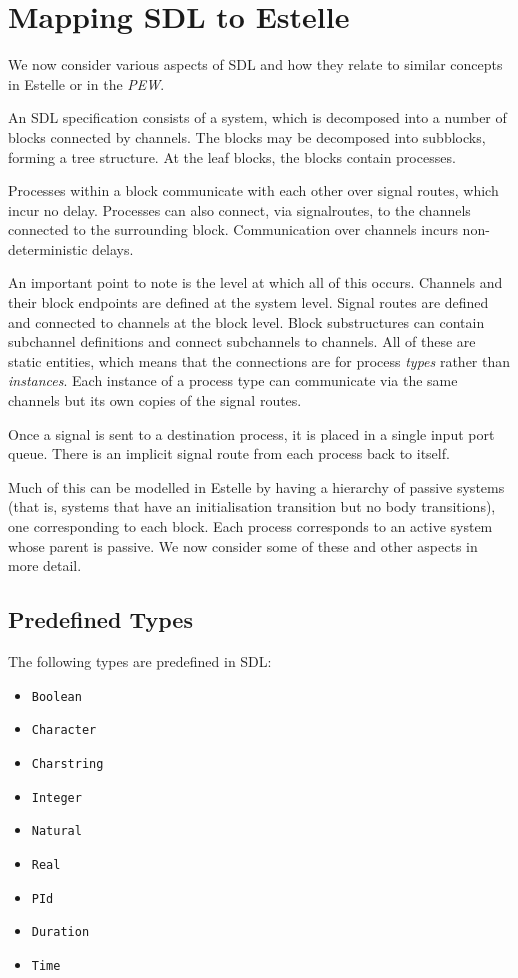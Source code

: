 \section{Mapping SDL to Estelle}

We now consider various aspects of SDL and how they relate to similar
concepts in Estelle or in the {\em PEW}.

An SDL specification consists of a system, which is decomposed into
a number of blocks connected by channels. 
The blocks may be decomposed into subblocks, forming a tree structure. 
At the leaf blocks, the blocks contain processes.

Processes within a block communicate with each other over signal
routes, which incur no delay.
Processes can also connect, via signalroutes, to the channels connected
to the surrounding block.
Communication over channels incurs non-deterministic delays.

An important point to note is the level at which all of this occurs.
Channels and their block endpoints are defined at the system level.
Signal routes are defined and connected to channels at the block level.
Block substructures can contain subchannel definitions and connect
subchannels to channels.
All of these are static entities, which means that the connections are
for process {\em types} rather than {\em instances}. 
Each instance of a process type can communicate via the same channels 
but its own copies of the signal routes. 

Once a signal is sent to a destination process, it is placed in
a single input port queue.
There is an implicit signal route from each process back to itself.

Much of this can be modelled in Estelle by having a hierarchy
of passive systems (that is, systems that have an initialisation
transition but no body transitions), one corresponding to each block.
Each process corresponds to an active system whose parent is passive.
We now consider some of these and other aspects in more detail.

\subsection{Predefined Types}

The following types are predefined in SDL:

\begin{itemize}
\item {\tt Boolean}
\item {\tt Character}
\item {\tt Charstring}
\item {\tt Integer}
\item {\tt Natural}
\item {\tt Real}
\item {\tt PId}
\item {\tt Duration}
\item {\tt Time}
\end{itemize}

